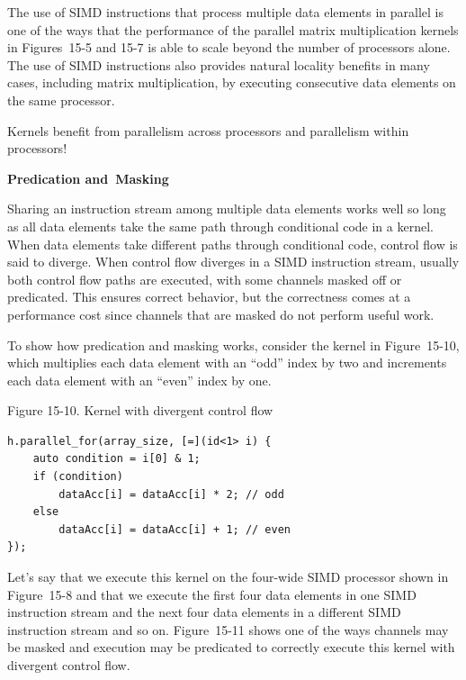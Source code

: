 The use of SIMD instructions that process multiple data elements in parallel is one of the ways that the performance of the parallel matrix multiplication kernels in Figures 15-5 and 15-7 is able to scale beyond the number of processors alone. The use of SIMD instructions also provides natural locality benefits in many cases, including matrix multiplication, by executing consecutive data elements on the same processor.\par

\begin{tcolorbox}[colback=red!5!white,colframe=red!75!black]
Kernels benefit from parallelism across processors and parallelism within processors!
\end{tcolorbox}

\hspace*{\fill} \par %
\textbf{Predication and Masking}

Sharing an instruction stream among multiple data elements works well so long as all data elements take the same path through conditional code in a kernel. When data elements take different paths through conditional code, control flow is said to diverge. When control flow diverges in a SIMD instruction stream, usually both control flow paths are executed, with some channels masked off or predicated. This ensures correct behavior, but the correctness comes at a performance cost since channels that are masked do not perform useful work.\par

To show how predication and masking works, consider the kernel in Figure 15-10, which multiplies each data element with an “odd” index by two and increments each data element with an “even” index by one.\par

\hspace*{\fill} \par %
Figure 15-10. Kernel with divergent control flow
\begin{lstlisting}[caption={}]
h.parallel_for(array_size, [=](id<1> i) {
	auto condition = i[0] & 1;
	if (condition)
		dataAcc[i] = dataAcc[i] * 2; // odd
	else
		dataAcc[i] = dataAcc[i] + 1; // even
});
\end{lstlisting}

Let’s say that we execute this kernel on the four-wide SIMD processor shown in Figure 15-8 and that we execute the first four data elements in one SIMD instruction stream and the next four data elements in a different SIMD instruction stream and so on. Figure 15-11 shows one of the ways channels may be masked and execution may be predicated to correctly execute this kernel with divergent control flow.\par


